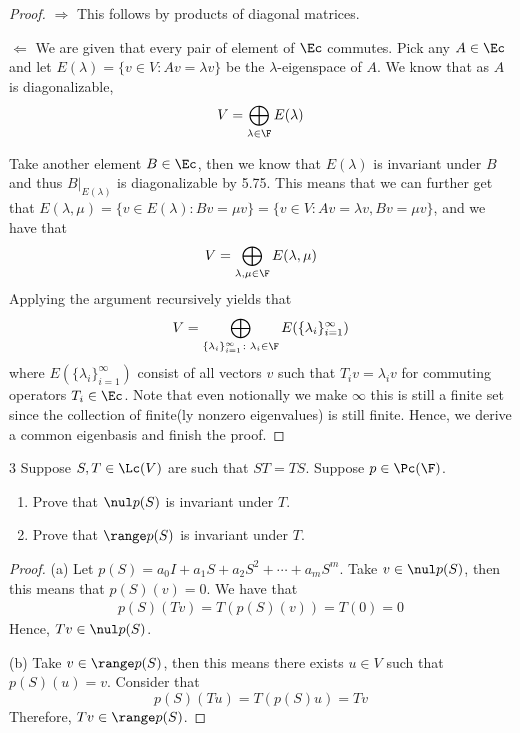 \documentclass{extarticle}
\begin{document}
\begin{proof}
\(\Rightarrow\) This follows by products of diagonal matrices.

\(\Leftarrow\) We are given that every pair of element of \(\Ec\) commutes. Pick any \(A \in \Ec\) and 
let \(E(\lambda) = \{v \in V \colon Av = \lambda v\}\) be the \(\lambda\)-eigenspace of \(A\). We know 
that as \(A\) is diagonalizable, 
\[V = \bigoplus_{\lambda \in \F} E(\lambda)\] 

Take another element \(B \in \Ec\), then we know that \(E(\lambda)\) is invariant under \(B\) and thus 
\(B|_{E(\lambda)}\) is diagonalizable by 5.75. This means that we can further get that \(E(\lambda, \mu) 
= \{v \in E(\lambda) \colon Bv = \mu v\} = \{v \in V \colon Av=\lambda v, Bv = \mu v\}\), and we have that 
\[V = \bigoplus_{\lambda, \mu \in \F} E(\lambda, \mu)\]
Applying the argument recursively yields that 
\[V = \bigoplus_{\{\lambda_i\}_{i=1}^\infty \colon \lambda_i \in \F} E(\{\lambda_i\}_{i=1}^\infty) \]
where \(E(\{\lambda_i\}_{i=1}^\infty)\) consist of all vectors \(v\) such that 
\(T_i v = \lambda_i v\) for commuting operators \(T_i \in \Ec\). Note that even notionally we make 
\(\infty\) this is still a finite set since the collection of finite(ly nonzero eigenvalues) is still 
finite. Hence, we derive a common eigenbasis and finish the proof.
\end{proof}

\begin{problem}{3}
    Suppose \(S, T \in \Lc(V)\) are such that \(ST = TS\). Suppose \(p \in \Pc(\F)\). 
    \begin{enumerate}[label=(\alph*)]
        \item Prove that \(\nul p(S)\) is invariant under \(T\). 
        \item Prove that \(\range p(S)\) is invariant under \(T\).
    \end{enumerate}
\end{problem}

\begin{proof}
(a) Let \(p(S) = a_0I + a_1 S + a_2 S^2 + \cdots + a_m S^m\). Take \(v \in \nul p(S)\), then this means that 
\(p(S)(v) = 0\). We have that 
\begin{align*}
    p(S)(Tv) = T(p(S)(v)) = T(0) = 0 
\end{align*}
Hence, \(Tv \in \nul p(S)\). 

(b) Take \(v \in \range p(S)\), then this means there exists \(u \in V\) such that \(p(S)(u) = v\). Consider that 
\[p(S)(Tu) = T(p(S)u) = Tv\]
Therefore, \(Tv \in \range p(S)\).
\end{proof}
\end{document}

